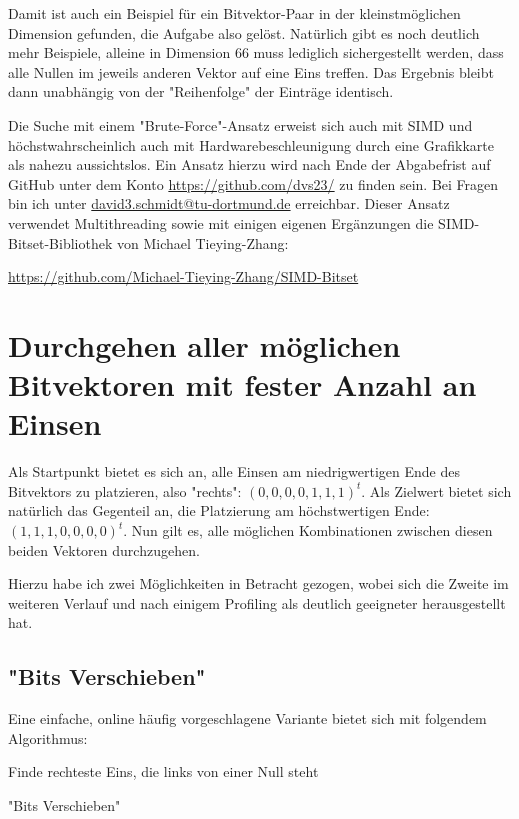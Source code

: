 \documentclass{article}
\begin{document}
Damit ist auch ein Beispiel für ein Bitvektor-Paar in der kleinstmöglichen Dimension gefunden, die Aufgabe also gelöst.
Natürlich gibt es noch deutlich mehr Beispiele, alleine in Dimension 66 muss lediglich sichergestellt werden, dass alle Nullen im jeweils anderen Vektor auf eine Eins treffen. Das Ergebnis bleibt dann unabhängig von der "Reihenfolge" der Einträge identisch.

Die Suche mit einem "Brute-Force"-Ansatz erweist sich auch mit SIMD und höchstwahrscheinlich auch mit Hardwarebeschleunigung durch eine Grafikkarte als nahezu aussichtslos. Ein Ansatz hierzu wird nach Ende der Abgabefrist auf GitHub unter dem Konto \url{https://github.com/dvs23/} zu finden sein. Bei Fragen bin ich unter \href{mailto:david3.schmidt@tu-dortmund.de}{david3.schmidt@tu-dortmund.de} erreichbar. Dieser Ansatz verwendet Multithreading sowie mit einigen eigenen Ergänzungen die SIMD-Bitset-Bibliothek von Michael Tieying-Zhang:

\url{https://github.com/Michael-Tieying-Zhang/SIMD-Bitset}

\section{Durchgehen aller möglichen Bitvektoren mit fester Anzahl an Einsen}

Als Startpunkt bietet es sich an, alle Einsen am niedrigwertigen Ende des Bitvektors zu platzieren, also "rechts": $(0,0,0,0,1,1,1)^t$.
Als Zielwert bietet sich natürlich das Gegenteil an, die Platzierung am höchstwertigen Ende: $(1,1,1,0,0,0,0)^t$. Nun gilt es, alle möglichen Kombinationen zwischen diesen beiden Vektoren durchzugehen.

Hierzu habe ich zwei Möglichkeiten in Betracht gezogen, wobei sich die Zweite im weiteren Verlauf und nach einigem Profiling als deutlich geeigneter herausgestellt hat.

\subsection{"Bits Verschieben"}

Eine einfache, online häufig vorgeschlagene Variante bietet sich mit folgendem Algorithmus:

\begin{algorithm}[H]
 Finde rechteste Eins, die links von einer Null steht\;
 \caption{"Bits Verschieben"}
\end{algorithm}
\end{document}

